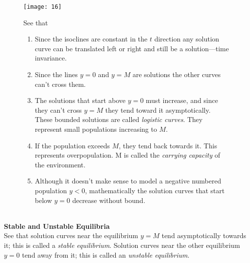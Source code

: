 \documentclass{report}
\begin{document}
\begin{figure}[h]
\begin{center}
\texttt{[image: 16]}\\
\end{center}
See that
\begin{enumerate}
\item Since the isoclines are constant in the $t$ direction any solution curve can be translated left or right and 
still be a solution---time invariance.
\item Since the lines $y=0$ and $y=M$ are solutions the other curves can't cross them.
\item The solutions that start above $y=0$ must increase, and since they can't cross $y=M$ they 
tend toward it asymptotically. These bounded solutions
are called \textit{logistic curves}. They represent small populations increasing to $M$.
\item If the population exceeds $M$, they tend back towards it. This represents overpopulation. M is called the 
\textit{carrying capacity} of the environment.
\item Although it doesn't make sense to model a negative numbered population $y<0$, mathematically the solution
curves that start below $y=0$ decrease without bound.
\end{enumerate}
\end{figure}\\
\textbf{Stable and Unstable Equilibria}\\
See that solution curves near the equilibrium $y=M$ tend asymptotically towards it; this is called a 
\textit{stable equilibrium}. Solution curves near the other equilibrium $y=0$ tend away from it; this is called
an \textit{unstable equilibrium}.
\newpage
\end{document}
